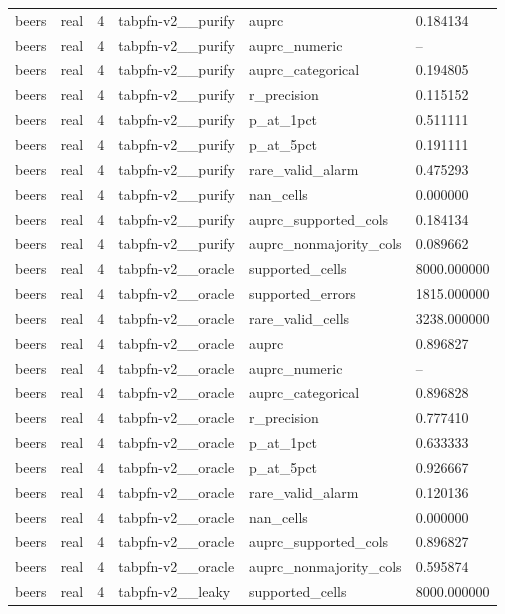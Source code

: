 \begin{tabular}{llllll}
beers & real & 4 & tabpfn-v2\_\_purify & auprc & 0.184134 \\
beers & real & 4 & tabpfn-v2\_\_purify & auprc\_numeric & -- \\
beers & real & 4 & tabpfn-v2\_\_purify & auprc\_categorical & 0.194805 \\
beers & real & 4 & tabpfn-v2\_\_purify & r\_precision & 0.115152 \\
beers & real & 4 & tabpfn-v2\_\_purify & p\_at\_1pct & 0.511111 \\
beers & real & 4 & tabpfn-v2\_\_purify & p\_at\_5pct & 0.191111 \\
beers & real & 4 & tabpfn-v2\_\_purify & rare\_valid\_alarm & 0.475293 \\
beers & real & 4 & tabpfn-v2\_\_purify & nan\_cells & 0.000000 \\
beers & real & 4 & tabpfn-v2\_\_purify & auprc\_supported\_cols & 0.184134 \\
beers & real & 4 & tabpfn-v2\_\_purify & auprc\_nonmajority\_cols & 0.089662 \\
beers & real & 4 & tabpfn-v2\_\_oracle & supported\_cells & 8000.000000 \\
beers & real & 4 & tabpfn-v2\_\_oracle & supported\_errors & 1815.000000 \\
beers & real & 4 & tabpfn-v2\_\_oracle & rare\_valid\_cells & 3238.000000 \\
beers & real & 4 & tabpfn-v2\_\_oracle & auprc & 0.896827 \\
beers & real & 4 & tabpfn-v2\_\_oracle & auprc\_numeric & -- \\
beers & real & 4 & tabpfn-v2\_\_oracle & auprc\_categorical & 0.896828 \\
beers & real & 4 & tabpfn-v2\_\_oracle & r\_precision & 0.777410 \\
beers & real & 4 & tabpfn-v2\_\_oracle & p\_at\_1pct & 0.633333 \\
beers & real & 4 & tabpfn-v2\_\_oracle & p\_at\_5pct & 0.926667 \\
beers & real & 4 & tabpfn-v2\_\_oracle & rare\_valid\_alarm & 0.120136 \\
beers & real & 4 & tabpfn-v2\_\_oracle & nan\_cells & 0.000000 \\
beers & real & 4 & tabpfn-v2\_\_oracle & auprc\_supported\_cols & 0.896827 \\
beers & real & 4 & tabpfn-v2\_\_oracle & auprc\_nonmajority\_cols & 0.595874 \\
beers & real & 4 & tabpfn-v2\_\_leaky & supported\_cells & 8000.000000 \\

\end{tabular}
